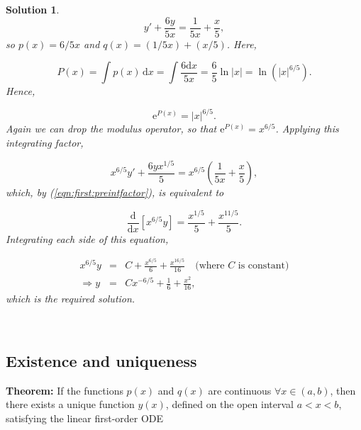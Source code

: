 \documentclass[a4paper]{report}
\newtheorem*{solution}{Solution}
\begin{document}
\begin{solution}
\begin{displaymath}
y' + \frac{6y}{5x} = \frac{1}{5x} + \frac{x}{5},
\end{displaymath}
\noindent so $p(x)=6/5x$ and $q(x)=(1/5x)+(x/5)$. Here,

\begin{displaymath}
P(x) = \int p(x)\,\mathrm{d}x= \int \frac{\mathrm{6d}x}{5x}= \frac{6}{5}\ln |x|= \ln \left(|x|^{6/5}\right).
\end{displaymath} 
\noindent Hence,

\begin{displaymath}
\mathrm{e}^{P(x)} = |x|^{6/5}.
\end{displaymath}
\noindent Again we can drop the modulus operator, so that $\displaystyle{\mathrm{e}^{P(x)}=x^{6/5}}$. Applying this integrating factor,

\begin{displaymath}
x^{6/5}y' + \frac{6yx^{1/5}}{5} = x^{6/5} \left(\frac{1}{5x} + \frac{x}{5}\right),
\end{displaymath}
\noindent which, by (\ref{eqn:first:preintfactor}), is equivalent to

\begin{displaymath}
\frac{\mathrm{d}}{\mathrm{d}x} \left[x^{6/5}y\right]=  \frac{x^{1/5}}{5} + \frac{x^{11/5}}{5}.
\end{displaymath}
\noindent Integrating each side of this equation,

\begin{eqnarray*}
x^{6/5}y &=& C + \frac{x^{6/5}}{6}+\frac{x^{16/5}}{16}\quad\mbox{(where $C$ is constant)}\\
\Longrightarrow y &=& Cx^{-6/5} + \frac{1}{6} + \frac{x^2}{16}, 
\end{eqnarray*}
\noindent which is the required solution.\\

\par \noindent [{\bf Check:} $\displaystyle{5xy'+6y=-6Cx^{-6/5}+\frac{5x^2}{8}+6Cx^{-6/5}+1+\frac{3x^2}{8}=1+x^2}$, as required.] \\
\end{solution}

\subsection{Existence and uniqueness}
\label{subsec:first:linearexist}
{\bf Theorem:} If the functions $p(x)$ and $q(x)$ are continuous $\forall x \in (a,b)$, then there exists a unique function $y(x)$, defined on the open interval $a < x < b$, satisfying the linear first-order ODE
\end{document}
